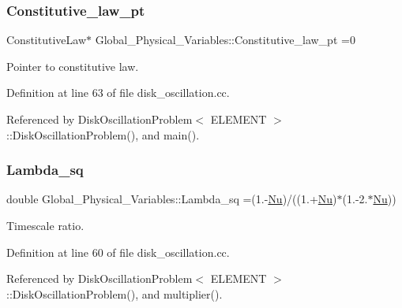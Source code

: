 \subsubsection{\texorpdfstring{Constitutive\+\_\+law\+\_\+pt}{Constitutive\_law\_pt}}
{\footnotesize\ttfamily Constitutive\+Law$\ast$ Global\+\_\+\+Physical\+\_\+\+Variables\+::\+Constitutive\+\_\+law\+\_\+pt =0}



Pointer to constitutive law. 



Definition at line 63 of file disk\+\_\+oscillation.\+cc.



Referenced by Disk\+Oscillation\+Problem$<$ E\+L\+E\+M\+E\+N\+T $>$\+::\+Disk\+Oscillation\+Problem(), and main().

\mbox{\label{namespaceGlobal__Physical__Variables_a6fe17557ceb32dd353827fba60408363}} 
\subsubsection{\texorpdfstring{Lambda\+\_\+sq}{Lambda\_sq}}
{\footnotesize\ttfamily double Global\+\_\+\+Physical\+\_\+\+Variables\+::\+Lambda\+\_\+sq =(1.-\/\hyperlink{namespaceGlobal__Physical__Variables_a3962c36313826b19f216f6bbbdd6a477}{Nu})/((1.+\hyperlink{namespaceGlobal__Physical__Variables_a3962c36313826b19f216f6bbbdd6a477}{Nu})$\ast$(1.-\/2.$\ast$\hyperlink{namespaceGlobal__Physical__Variables_a3962c36313826b19f216f6bbbdd6a477}{Nu}))}



Timescale ratio. 



Definition at line 60 of file disk\+\_\+oscillation.\+cc.



Referenced by Disk\+Oscillation\+Problem$<$ E\+L\+E\+M\+E\+N\+T $>$\+::\+Disk\+Oscillation\+Problem(), and multiplier().

\mbox{\label{namespaceGlobal__Physical__Variables_a3962c36313826b19f216f6bbbdd6a477}} 
